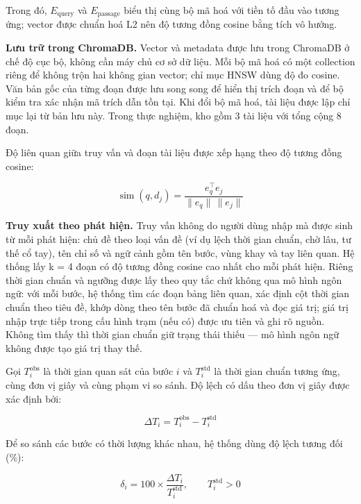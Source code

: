 Trong đó, $E_{\text{query}}$ và $E_{\text{passage}}$ biểu thị cùng bộ mã hoá với tiền tố đầu vào tương ứng; vector được chuẩn hoá L2 nên độ tương đồng cosine bằng tích vô hướng.

\textbf{Lưu trữ trong ChromaDB.} Vector và metadata được lưu trong ChromaDB ở chế độ cục bộ, không cần máy chủ cơ sở dữ liệu. Mỗi bộ mã hoá có một collection riêng để không trộn hai không gian vector; chỉ mục HNSW dùng độ đo cosine. Văn bản gốc của từng đoạn được lưu song song để hiển thị trích đoạn và để bộ kiểm tra xác nhận mã trích dẫn tồn tại. Khi đổi bộ mã hoá, tài liệu được lập chỉ mục lại từ bản lưu này. Trong thực nghiệm, kho gồm 3 tài liệu với tổng cộng 8 đoạn.

Độ liên quan giữa truy vấn và đoạn tài liệu được xếp hạng theo độ tương đồng cosine:

\begin{equation} \operatorname{sim}(q, d_j) = \frac{e_q^{\top} e_j}{\lVert e_q \rVert \, \lVert e_j \rVert} \end{equation}

\textbf{Truy xuất theo phát hiện.} Truy vấn không do người dùng nhập mà được sinh từ mỗi phát hiện: chủ đề theo loại vấn đề (ví dụ lệch thời gian chuẩn, chờ lâu, tư thế cổ tay), tên chỉ số và ngữ cảnh gồm tên bước, vùng khay và tay liên quan. Hệ thống lấy k = 4 đoạn có độ tương đồng cosine cao nhất cho mỗi phát hiện. Riêng thời gian chuẩn và ngưỡng được lấy theo quy tắc chứ không qua mô hình ngôn ngữ: với mỗi bước, hệ thống tìm các đoạn bảng liên quan, xác định cột thời gian chuẩn theo tiêu đề, khớp dòng theo tên bước đã chuẩn hoá và đọc giá trị; giá trị nhập trực tiếp trong cấu hình trạm (nếu có) được ưu tiên và ghi rõ nguồn. Không tìm thấy thì thời gian chuẩn giữ trạng thái thiếu — mô hình ngôn ngữ không được tạo giá trị thay thế.

Gọi $T_i^{\text{obs}}$ là thời gian quan sát của bước $i$ và $T_i^{\text{std}}$ là thời gian chuẩn tương ứng, cùng đơn vị giây và cùng phạm vi so sánh. Độ lệch có dấu theo đơn vị giây được xác định bởi:

\begin{equation} \Delta T_i = T_i^{\text{obs}} - T_i^{\text{std}} \end{equation}

Để so sánh các bước có thời lượng khác nhau, hệ thống dùng độ lệch tương đối (\%):

\begin{equation} \delta_i = 100 \times \frac{\Delta T_i}{T_i^{\text{std}}}, \qquad T_i^{\text{std}} > 0 \end{equation}

